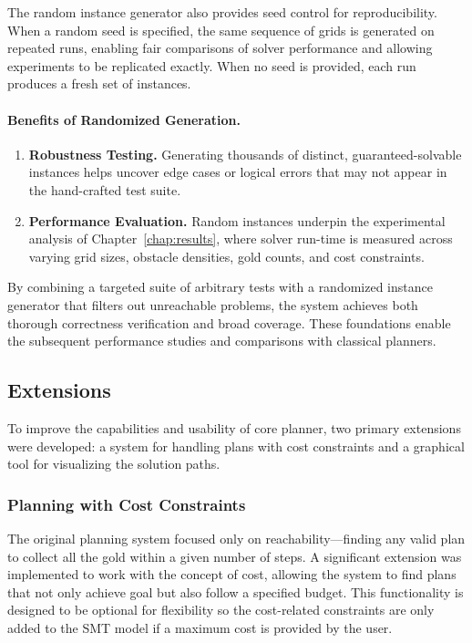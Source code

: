 \documentclass[12pt, a4paper, oneside]{report} %
\begin{document}
The random instance generator also provides seed control for reproducibility. When a random seed is specified, the same sequence of grids is generated on repeated runs, enabling fair comparisons of solver performance and allowing experiments to be replicated exactly. When no seed is provided, each run produces a fresh set of instances.

\paragraph{Benefits of Randomized Generation.}
\begin{enumerate}
    \item \textbf{Robustness Testing.} Generating thousands of distinct, 
    guaranteed-solvable instances helps uncover edge cases or logical errors 
    that may not appear in the hand-crafted test suite.
    \item \textbf{Performance Evaluation.} Random instances underpin the 
    experimental analysis of Chapter~\ref{chap:results}, where solver run-time 
    is measured across varying grid sizes, obstacle densities, gold counts, 
    and cost constraints.
\end{enumerate}

By combining a targeted suite of arbitrary tests with a randomized instance 
generator that filters out unreachable problems, the system achieves both 
thorough correctness verification and broad coverage. These foundations 
enable the subsequent performance studies and comparisons with classical 
planners.
\subsection{Extensions}
\label{section_extentions}
To improve the capabilities and usability of core planner, two primary extensions were developed: a system for handling plans with cost constraints and a graphical tool for visualizing the solution paths.
\subsubsection{Planning with Cost Constraints}
The original planning system focused only on reachability—finding any valid plan to collect all the gold within a given number of steps. A significant extension was implemented to work with the concept of cost, allowing the system to find plans that not only achieve goal but also follow a specified budget. This functionality is designed to be optional for flexibility so the cost-related constraints are only added to the SMT model if a maximum cost is provided by the user.
\end{document}
